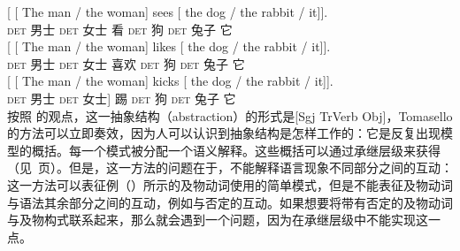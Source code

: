 \eal
\label{Beispiele-fuer-Transitivkonstruktion}
\ex
\gll  {}[ [ The man / the woman] sees  [ the dog / the rabbit / it]].\\
     {} {} \textsc{det} 男士 {} \textsc{det} 女士 看  {} \textsc{det} 狗 {} \textsc{det} 兔子 {} 它\\
\ex 
\gll  {}[ [ The man / the woman] likes [ the dog / the rabbit / it]].\\
     {} {} \textsc{det} 男士 {} \textsc{det} 女士 喜欢 {} \textsc{det} 狗 {} \textsc{det} 兔子 {} 它\\
\ex 
\gll  {}[ [ The man / the woman] kicks [ the dog / the rabbit / it]].\\
     {} {} \textsc{det} 男士 {} \textsc{det} 女士] 踢 {} \textsc{det} 狗 {} \textsc{det} 兔子 {} 它\\
\zl
按照 \citet[]{Tomasello2003a}的观点，这一抽象结构（abstraction）的形式是[Sgj TrVerb Obj]，Tomasello的方法可以立即奏效，因为人可以认识到抽象结构是怎样工作的：它是反复出现模型的概括。每一个模式被分配一个语义解释。这些概括可以通过承继层级来获得（见~\pageref{Seite-Typhierarchie}页）\citep[]{Croft2001a}。但是，这一方法的问题在于，不能解释语言现象不同部分之间的互动：这一方法可以表征例（）所示的及物动词使用的简单模式，但是不能表征及物动词与语法其余部分之间的互动，例如与否定的互动。如果想要将带有否定的及物动词与及物构式联系起来，那么就会遇到一个问题，因为在承继层级中不能实现这一点。
